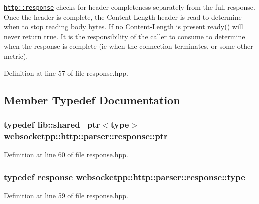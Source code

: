 \href{http::response}{\tt http\+::response} checks for header completeness separately from the full response. Once the header is complete, the Content-\/\+Length header is read to determine when to stop reading body bytes. If no Content-\/\+Length is present \hyperlink{classwebsocketpp_1_1http_1_1parser_1_1response_a2514419dcd5e2f9502f69abd4684d9c1}{ready()} will never return true. It is the responsibility of the caller to consume to determine when the response is complete (ie when the connection terminates, or some other metric). 

Definition at line 57 of file response.\+hpp.



\subsection{Member Typedef Documentation}
\hypertarget{classwebsocketpp_1_1http_1_1parser_1_1response_a4072a02adfa5e60b4e23246d561d9c25}{}
\subsubsection[{ptr}]{\setlength{\rightskip}{0pt plus 5cm}typedef lib\+::shared\+\_\+ptr$<${\bf type}$>$ {\bf websocketpp\+::http\+::parser\+::response\+::ptr}}\label{classwebsocketpp_1_1http_1_1parser_1_1response_a4072a02adfa5e60b4e23246d561d9c25}


Definition at line 60 of file response.\+hpp.

\hypertarget{classwebsocketpp_1_1http_1_1parser_1_1response_ac8666204343c97725f35fd1aa8573c2b}{}
\subsubsection[{type}]{\setlength{\rightskip}{0pt plus 5cm}typedef {\bf response} {\bf websocketpp\+::http\+::parser\+::response\+::type}}\label{classwebsocketpp_1_1http_1_1parser_1_1response_ac8666204343c97725f35fd1aa8573c2b}


Definition at line 59 of file response.\+hpp.



